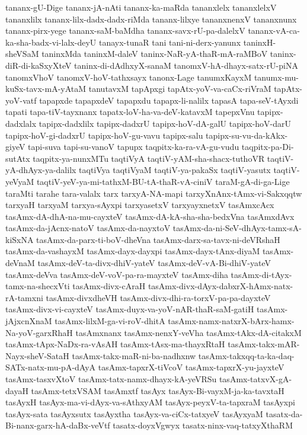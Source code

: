 {tananx-gU-Dige
tananx-jA-nAti
tananx-ka-maRda
tananxlelx
tananxlelxV
tananxlilx
tananx-lilx-dadx-dadx-riMda
tananx-lilxye
tananxnenxV
tananxnunx
tananx-pirx-yege
tananx-saM-baMdha
tananx-savx-rU-pa-dalelxV
tananx-vA-ca-ka-sha-badx-vi-lalx-deyU
tanayx-tunaR
tani
tani-ni-derx-yanunx
taninxH-sheVSaM
taninxMda
taninxM-daleV
taninx-NaR-yA-thaR-mA-raMBoV
taninx-diR-di-kaSxyXteV
taninx-di-dAdhxyX-sanaM
tanomxV-hA-dhayx-satx-rU-piNA
tanomxVhoV
tanomxV-hoV-tathxsayx
tanonx-Lage
tanumxKayxM
tanumx-mu-kuSx-tavx-mA-yAtaM
tanutavxM
tapApxgi
tapAtx-yoV-va-caCx-riVraM
tapAtx-yoV-vatf
tapapxde
tapapxdeV
tapapxdu
tapapx-li-nalilx
tapasA
tapa-seV-tAyxdi
tapati
tapa-tiV-tayxnanx
tapatx-loV-ha-va-deV-katavxM
tapepxVnu
tapipx-dadxlalx
tapipx-dadxlilx
tapipx-dadxrU
tapipx-hoV-dA-galU
tapipx-hoV-darU
tapipx-hoV-gi-dadxrU
tapipx-hoV-gu-vavu
tapipx-salu
tapipx-su-vu-da-kAkx-giyeV
tapi-suva
tapi-su-vanoV
tapupx
taqpitx-ka-ra-vA-gu-vudu
taqpitx-pa-Di-sutAtx
taqpitx-ya-nunxMTu
taqtiVyA
taqtiV-yAM-sha-shacx-tuthoVR
taqtiV-yA-dhAyx-ya-dalilx
taqtiVya
taqtiVyaM
taqtiV-ya-pakaSx
taqtiV-yasutx
taqtiV-yeVyaM
taqtiV-yeV-ya-mi-tathxM-BU-tA-thaR-vA-ciniV
taraM-gA-di-ga-Lige
taraMti
tarahe
tara-valalx
tarx
tarxyA-NA-mapi
tarxyXnAnx-tAmx-vi-Sakxqqtw
tarxyaH
tarxyaM
tarxya-sAyxpi
tarxyasetxV
tarxyayxnetxV
tasAmxcAcx
tasAmx-dA-dhA-na-mu-cayxteV
tasAmx-dA-kA-sha-sha-bedxVna
tasAmxdAvx
tasAmx-da-jAcnx-natoV
tasAmx-da-nayxtoV
tasAmx-da-ni-SeV-dhAyx-tamx-sA-kiSxNA
tasAmx-da-parx-ti-boV-dheVna
tasAmx-darx-sa-tavx-ni-deVRshaH
tasAmx-da-vashayxM
tasAmx-dayx-dayxpi
tasAmx-dayx-tAnx-diyaM
tasAmx-deVnaM
tasAmx-deV-ta-divx-dhiV-yateV
tasAmx-deV-vA-Bi-dhiV-yateV
tasAmx-deVva
tasAmx-deV-voV-pa-ra-mayxteV
tasAmx-diha
tasAmx-di-tAyx-tamx-na-shecxVti
tasAmx-divx-cAraH
tasAmx-divx-dAyx-dabxrX-hAmx-natx-rA-tamxni
tasAmx-divxdheVH
tasAmx-divx-dhi-ra-torxV-pa-pa-dayxteV
tasAmx-divx-vi-cayxteV
tasAmx-duyx-va-yoV-nAR-thaR-saM-gatiH
tasAmx-jAjxcnXnaM
tasAmx-lilxM-ga-vi-roV-dhitA
tasAmx-namx-natxrX-bArx-hamx-Na-yoV-garxRhaH
tasAmxnanx
tasAmx-nenxY-veVha
tasAmx-tAkx-dA-citakxM
tasAmx-tApx-NaDx-ra-vAsAH
tasAmx-tAsx-ma-thayxRtaH
tasAmx-takx-mAR-Nayx-sheV-SataH
tasAmx-takx-maR-ni-ba-nadhxnw
tasAmx-takxqq-ta-ka-daq-SATx-natx-mu-pA-dAyA
tasAmx-tapxrX-tiVcoV
tasAmx-tapxrX-yu-jayxteV
tasAmx-tasxvXtoV
tasAmx-tatx-namx-dhayx-kA-yeVRSu
tasAmx-tatxvX-gA-dayaH
tasAmx-tetxVSAM
tasAmxtf
tasAyx
tasAyx-Bi-vayxM-ja-ka-tavxtaH
tasAyxH
tasAyx-ma-vi-dAyx-va-sAthxyAM
tasAyx-peyxV-ta-tapxraM
tasAyxpi
tasAyx-sata
tasAyxsutx
tasAyxtha
tasAyx-va-ciCx-tatxyeV
tasAyxyaM
tasatx-da-Bi-nanx-garx-hA-daBx-veVtf
tasatx-doyxVgwyx
tasatx-ninx-vaq-tatxyXthaRM
}
